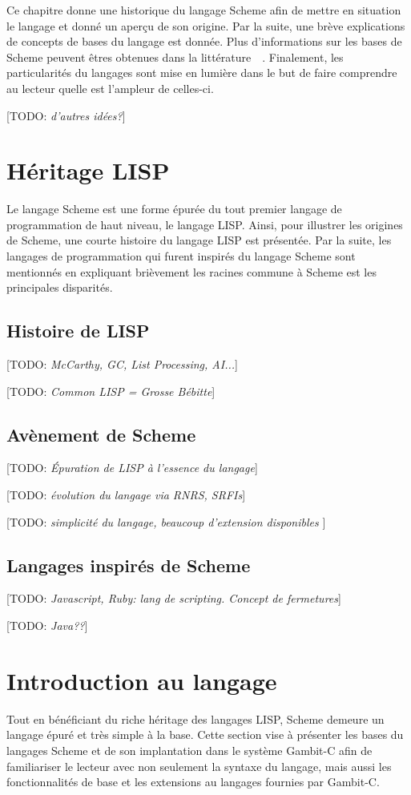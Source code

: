 \documentclass[12pt,oneside,letterpaper,francais]{book}
\newcommand{\todo}[1]{[TODO: {\it #1}]}
\begin{document}
Ce chapitre donne une historique du langage Scheme afin de mettre en
situation le langage et donné un aperçu de son origine. Par la suite,
une brève explications de concepts de bases du langage est
donnée. Plus d'informations sur les bases de Scheme peuvent êtres
obtenues dans la littérature~\cite{R5RS}~\cite{SICP}. Finalement, les
particularités du langages sont mise en lumière dans le but de faire
comprendre au lecteur quelle est l'ampleur de celles-ci.

\todo{d'autres idées?}

\section{Héritage LISP}
\label{Scheme:hist}

Le langage Scheme est une forme épurée du tout premier langage de
programmation de haut niveau, le langage LISP. Ainsi, pour illustrer
les origines de Scheme, une courte histoire du langage LISP est
présentée. Par la suite, les langages de programmation qui furent
inspirés du langage Scheme sont mentionnés en expliquant brièvement
les racines commune à Scheme est les principales disparités.

\subsection{Histoire de LISP}
\todo{McCarthy, GC, List Processing, AI...}

\todo{Common LISP = Grosse Bébitte}

\subsection{Avènement de Scheme}
\todo{Épuration de LISP à l'essence du langage}

\todo{évolution du langage via RNRS, SRFIs}

\todo{simplicité du langage, beaucoup d'extension disponibles }

\subsection{Langages inspirés de Scheme}
\todo{Javascript, Ruby: lang de scripting. Concept de fermetures}

\todo{Java??}


\section{Introduction au langage}
Tout en bénéficiant du riche héritage des langages LISP, Scheme
demeure un langage épuré et très simple à la base. Cette section vise
à présenter les bases du langages Scheme et de son implantation dans
le système Gambit-C afin de familiariser le lecteur avec non seulement
la syntaxe du langage, mais aussi les fonctionnalités de base et les
extensions au langages fournies par Gambit-C.
\end{document}
